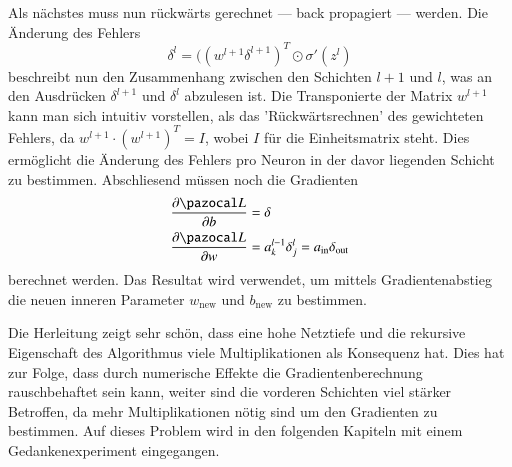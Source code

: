 Als nächstes muss nun rückwärts gerechnet --- back propagiert --- werden.
Die Änderung des Fehlers
\begin{equation}
\delta^{l} = ((w^{l+1} \delta^{l+1})^T \odot \sigma'(z^l)
\end{equation}
beschreibt nun den Zusammenhang zwischen den Schichten $l+1$ und $l$, was an den Ausdrücken $\delta^{l+1}$ und $ \delta^{l}$ abzulesen ist.
Die Transponierte der Matrix $w^{l+1}$ kann man sich intuitiv vorstellen, als das 'Rückwärtsrechnen' des gewichteten Fehlers, da $w^{l+1} \cdot (w^{l+1})^T = I$, wobei $I$ für die Einheitsmatrix steht.
Dies ermöglicht die Änderung des Fehlers pro Neuron in der davor liegenden Schicht zu bestimmen.
Abschliesend müssen noch die Gradienten
\begin{equation}
\begin{split}
\frac{\partial \Lb}{\partial b} & = \delta \\
\frac{\partial \Lb}{\partial w} & = a^{l-1}_{k} \delta^{l}_j = a_{\text{in}} \delta_{\text{out}}
\end{split}
\end{equation}
berechnet werden.
Das Resultat wird verwendet, um mittels Gradientenabstieg die neuen
inneren Parameter $w_\text{new}$ und $b_\text{new}$ zu bestimmen.

Die Herleitung zeigt sehr schön, dass eine hohe Netztiefe und die
rekursive Eigenschaft des Algorithmus viele Multiplikationen als
Konsequenz hat.
Dies hat zur Folge, dass durch numerische Effekte die Gradientenberechnung rauschbehaftet sein kann, weiter sind die vorderen Schichten viel stärker Betroffen, da mehr Multiplikationen nötig sind um den Gradienten zu bestimmen.
Auf dieses Problem wird in den folgenden Kapiteln mit einem Gedankenexperiment eingegangen.
%

